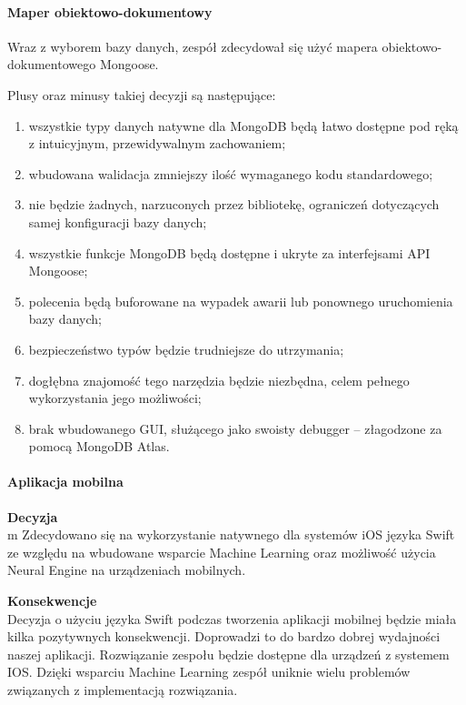\documentclass[12pt, a4paper, twoside, openany]{book}
\newcommand{\forceindent}{\leavevmode{\parindent=1.3em\indent}}
\begin{document}
\paragraph{Maper obiektowo-dokumentowy\\}
\forceindent Wraz z wyborem bazy danych, zespół zdecydował się użyć mapera obiektowo-dokumentowego Mongoose.

Plusy oraz minusy takiej decyzji są następujące:
\begin{enumerate}[label=--]
    \item wszystkie typy danych natywne dla MongoDB będą łatwo dostępne pod ręką z intuicyjnym, przewidywalnym zachowaniem;
    \item wbudowana walidacja zmniejszy ilość wymaganego kodu standardowego;
    \item nie będzie żadnych, narzuconych przez bibliotekę, ograniczeń dotyczących samej konfiguracji bazy danych;
    \item wszystkie funkcje MongoDB będą dostępne i ukryte za interfejsami API Mongoose;
    \item polecenia będą buforowane na wypadek awarii lub ponownego uruchomienia bazy danych;
    \item bezpieczeństwo typów będzie trudniejsze do utrzymania;
    \item dogłębna znajomość tego narzędzia będzie niezbędna, celem pełnego wykorzystania jego możliwości;
    \item brak wbudowanego GUI, służącego jako swoisty debugger -- złagodzone za pomocą MongoDB Atlas.
\end{enumerate}

\paragraph{Aplikacja mobilna\\}
\forceindent \textbf{Decyzja\\}m
\indent Zdecydowano się na wykorzystanie natywnego dla systemów iOS języka Swift ze względu na wbudowane wsparcie Machine Learning oraz możliwość użycia Neural Engine na urządzeniach mobilnych.

\textbf{Konsekwencje\\}
\indent Decyzja o użyciu języka Swift podczas tworzenia aplikacji mobilnej będzie miała kilka pozytywnych konsekwencji. Doprowadzi to do bardzo dobrej wydajności naszej aplikacji. Rozwiązanie zespołu będzie dostępne dla urządzeń z systemem IOS. Dzięki wsparciu Machine Learning zespół uniknie wielu problemów związanych z implementacją rozwiązania.
\end{document}
